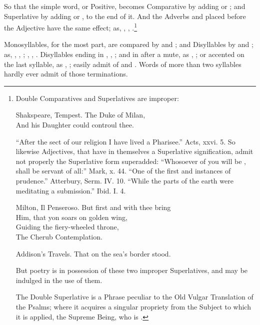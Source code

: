 So that the simple word, or Positive, becomes Comparative by adding
 or ; and Superlative by adding  or , to the
end of it. And the Adverbs  and  placed before the
Adjective have the same effect; as, , , .\footnote{Double Comparatives and Superlatives are improper:

  \begin{aquote}{Shakspeare, Tempest.}
    The Duke of Milan,\\
    And his  Daughter could controul thee.
  \end{aquote}

  ``After the  sect of our religion I have lived a
  Pharisee.'' Acts, xxvi. 5. So likewise Adjectives, that have in
  themselves a Superlative signification, admit not properly the
  Superlative form superadded: ``Whosoever of you will be ,
  shall be servant of all:'' Mark, x. 44. ``One of the first and
   instances of prudence.'' Atterbury, Serm. IV. 10.
  ``While the  parts of the earth were meditating a
  submission.'' Ibid. I. 4.

  \begin{aquote}{Milton, Il Penseroso.}
    But first and  with thee bring\\
    Him, that yon soars on golden wing,\\
    Guiding the fiery-wheeled throne,\\
    The Cherub Contemplation.
  \end{aquote}

  \begin{aquote}{Addison's Travels.}
    That on the sea's  border stood.
  \end{aquote}

  But poetry is in possession of these two improper Superlatives, and
  may be indulged in the use of them.

  The Double Superlative  is a Phrase peculiar to the
  Old Vulgar Translation of the Psalms; where it acquires a singular
  propriety from the Subject to which it is applied, the Supreme Being,
  who is .}

Monosyllables, for the most part, are compared by  and ;
and Disyllables by  and ; as, , ,
; , , .
Disyllables ending in , , ; and in 
after a mute, as , ; or accented on the last
syllable, as , ; easily admit of  and
. Words of more than two syllables hardly ever admit of those
terminations.


